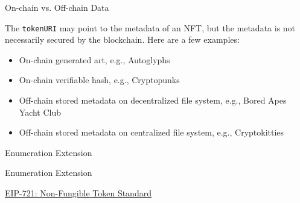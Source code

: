 \documentclass[]{beamer}
\begin{document}
\begin{frame}{On-chain vs. Off-chain Data}

The \texttt{tokenURI} may point to the metadata of an NFT, but the metadata is not necessarily secured by the blockchain. Here are a few examples:\\

	\begin{itemize}
		\item<2-> On-chain generated art, e.g., Autoglyphs %
		\item<3-> On-chain verifiable hash, e.g., Cryptopunks %
		\item<4-> Off-chain stored metadata on decentralized file system, e.g., Bored Apes Yacht Club %
		\item<5-> Off-chain stored metadata on centralized file system, e.g., Cryptokitties %
	\end{itemize}

\end{frame}

\begin{frame}{Enumeration Extension}
\begin{samplecode}{Enumeration Extension}
		
\end{samplecode}

\vspace{1 em}
\link \href{https://eips.ethereum.org/EIPS/eip-721}{EIP-721: Non-Fungible Token Standard}
\end{frame}

%	
%	
\end{document}
